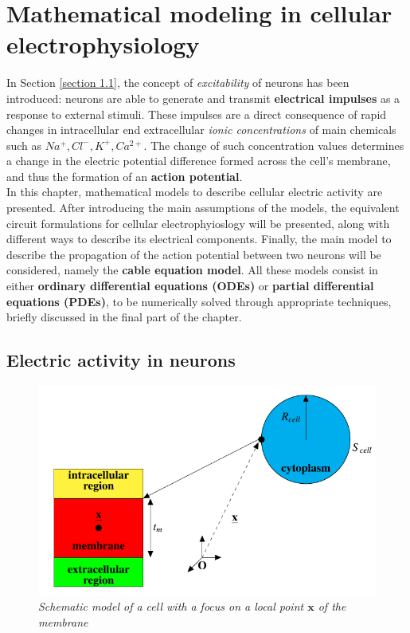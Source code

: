 \documentclass[12pt, a4paper]{article}
\begin{document}
\section{Mathematical modeling in cellular electrophysiology}

In Section \ref{section 1.1}, the concept of \textit{excitability} of neurons has been introduced: neurons are able to generate and transmit \textbf{electrical impulses} as a response to external stimuli. These impulses are a direct consequence of rapid changes in intracellular end extracellular \textit{ionic concentrations} of main chemicals such as $Na^+, Cl^-, K^+, Ca^{2+}$. The change of such concentration values determines a change in the electric potential difference formed across the cell's membrane, and thus the formation of an \textbf{action potential}. \\
In this chapter, mathematical models to describe cellular electric activity are presented. After introducing the main assumptions of the models, the equivalent circuit formulations for cellular electrophyioslogy will be presented, along with different ways to describe its electrical components. Finally, the main model to describe the propagation of the action potential between two neurons will be considered, namely the \textbf{cable equation model}. All these models consist in either \textbf{ordinary differential equations (ODEs)} or \textbf{partial differential equations (PDEs)}, to be numerically solved through appropriate techniques, briefly discussed in the final part of the chapter.

\subsection{Electric activity in neurons}


\begin{figure}[H]
	\begin{center}
		\includegraphics[scale=0.77]{first.png} 
	\end{center} 
	\caption{\textit{Schematic model of a cell with a focus on a local point $\textbf{x}$ of the membrane}}
	\label{first}
\end{figure}
\end{document}
